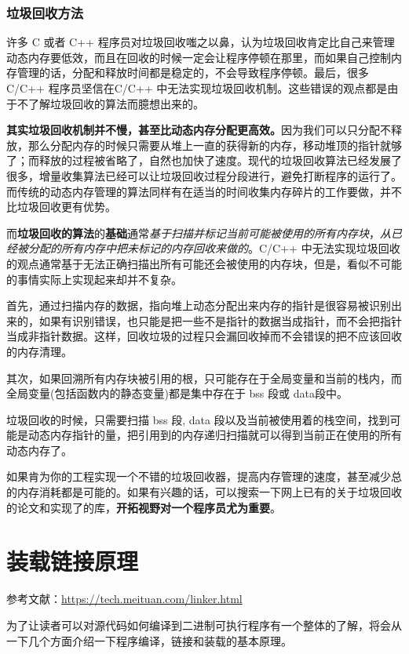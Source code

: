 \documentclass[UTF8,a4paper,12pt]{ctexbook}
\begin{document}
			
			
		\subsection{垃圾回收方法}
			许多 C 或者 C++ 程序员对垃圾回收嗤之以鼻，认为垃圾回收肯定比自己来管理动态内存要低效，而且在回收的时候一定会让程序停顿在那里，而如果自己控制内存管理的话，分配和释放时间都是稳定的，不会导致程序停顿。最后，很多 C/C++ 程序员坚信在C/C++ 中无法实现垃圾回收机制。这些错误的观点都是由于不了解垃圾回收的算法而臆想出来的。
			
			\textbf{其实垃圾回收机制并不慢，甚至比动态内存分配更高效。}因为我们可以只分配不释放，那么分配内存的时候只需要从堆上一直的获得新的内存，移动堆顶的指针就够了；而释放的过程被省略了，自然也加快了速度。现代的垃圾回收算法已经发展了很多，增量收集算法已经可以让垃圾回收过程分段进行，避免打断程序的运行了。而传统的动态内存管理的算法同样有在适当的时间收集内存碎片的工作要做，并不比垃圾回收更有优势。
			
			而\textbf{垃圾回收的算法}的\textbf{基础}通常\textit{基于扫描并标记当前可能被使用的所有内存块}，\textit{从已经被分配的所有内存中把未标记的内存回收来做的}。C/C++ 中无法实现垃圾回收的观点通常基于无法正确扫描出所有可能还会被使用的内存块，但是，看似不可能的事情实际上实现起来却并不复杂。
			
			首先，通过扫描内存的数据，指向堆上动态分配出来内存的指针是很容易被识别出来的，如果有识别错误，也只能是把一些不是指针的数据当成指针，而不会把指针当成非指针数据。这样，回收垃圾的过程只会漏回收掉而不会错误的把不应该回收的内存清理。
			
			其次，如果回溯所有内存块被引用的根，只可能存在于全局变量和当前的栈内，而全局变量(包括函数内的静态变量)都是集中存在于 bss 段或 data段中。
			
			垃圾回收的时候，只需要扫描 bss 段, data 段以及当前被使用着的栈空间，找到可能是动态内存指针的量，把引用到的内存递归扫描就可以得到当前正在使用的所有动态内存了。
			
			如果肯为你的工程实现一个不错的垃圾回收器，提高内存管理的速度，甚至减少总的内存消耗都是可能的。如果有兴趣的话，可以搜索一下网上已有的关于垃圾回收的论文和实现了的库，\textbf{开拓视野对一个程序员尤为重要}。
	
\chapter{装载链接原理}
	参考文献：\url{https://tech.meituan.com/linker.html}
	
	为了让读者可以对源代码如何编译到二进制可执行程序有一个整体的了解，将会从一下几个方面介绍一下程序编译，链接和装载的基本原理。
	
\end{document}
